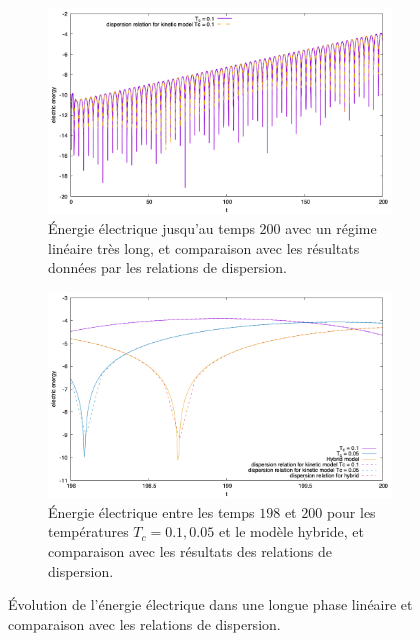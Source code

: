 \begin{figure}
  \centering
  \begin{subfigure}{0.8\textwidth}
    \centering
    \includegraphics[width=\textwidth]{img/limit_ee_Tf200_eps10m4.png}
    \caption{Énergie électrique jusqu'au temps $200$ avec un régime linéaire très long, et comparaison avec les résultats données par les relations de dispersion.}
    \label{fig:limit:ee:Tf200:eps10m4}
  \end{subfigure}
  \begin{subfigure}{0.8\textwidth}
    \centering
    \includegraphics[width=\textwidth]{img/limit_ee_Tf200_cmp_zoom.png}
    \caption{Énergie électrique entre les temps $198$ et $200$ pour les températures $T_c = 0.1,0.05$ et le modèle hybride, et comparaison avec les résultats des relations de dispersion.}
    \label{fig:limit:ee:Tf200:cmp_zoom}
  \end{subfigure}
  \caption{Évolution de l'énergie électrique dans une longue phase linéaire et comparaison avec les relations de dispersion.}
  \label{fig:limit:ee:Tf200}
\end{figure}
